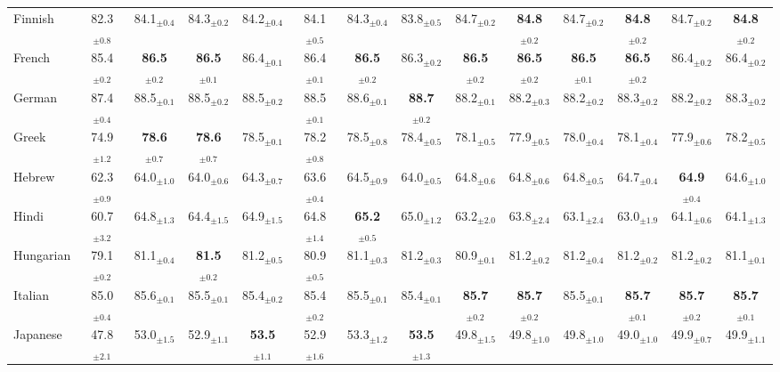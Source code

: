\begin{table*}[ht]
{\begin{tabular}{lccccccccccccc}
Finnish & 82.3$_{\pm 0.8}$ & 84.1$_{\pm 0.4}$ & 84.3$_{\pm 0.2}$ & 84.2$_{\pm 0.4}$ & 84.1$_{\pm 0.5}$ & 84.3$_{\pm 0.4}$ & 83.8$_{\pm 0.5}$ & 84.7$_{\pm 0.2}$ & \textbf{84.8}$_{\pm 0.2}$ & 84.7$_{\pm 0.2}$ & \textbf{84.8}$_{\pm 0.2}$ & 84.7$_{\pm 0.2}$ & \textbf{84.8}$_{\pm 0.2}$ \\
French & 85.4$_{\pm 0.2}$ & \textbf{86.5}$_{\pm 0.2}$ & \textbf{86.5}$_{\pm 0.1}$ & 86.4$_{\pm 0.1}$ & 86.4$_{\pm 0.1}$ & \textbf{86.5}$_{\pm 0.2}$ & 86.3$_{\pm 0.2}$ & \textbf{86.5}$_{\pm 0.2}$ & \textbf{86.5}$_{\pm 0.2}$ & \textbf{86.5}$_{\pm 0.1}$ & \textbf{86.5}$_{\pm 0.2}$ & 86.4$_{\pm 0.2}$ & 86.4$_{\pm 0.2}$ \\
German & 87.4$_{\pm 0.4}$ & 88.5$_{\pm 0.1}$ & 88.5$_{\pm 0.2}$ & 88.5$_{\pm 0.2}$ & 88.5$_{\pm 0.1}$ & 88.6$_{\pm 0.1}$ & \textbf{88.7}$_{\pm 0.2}$ & 88.2$_{\pm 0.1}$ & 88.2$_{\pm 0.3}$ & 88.2$_{\pm 0.2}$ & 88.3$_{\pm 0.2}$ & 88.2$_{\pm 0.2}$ & 88.3$_{\pm 0.2}$ \\
Greek & 74.9$_{\pm 1.2}$ & \textbf{78.6}$_{\pm 0.7}$ & \textbf{78.6}$_{\pm 0.7}$ & 78.5$_{\pm 0.1}$ & 78.2$_{\pm 0.8}$ & 78.5$_{\pm 0.8}$ & 78.4$_{\pm 0.5}$ & 78.1$_{\pm 0.5}$ & 77.9$_{\pm 0.5}$ & 78.0$_{\pm 0.4}$ & 78.1$_{\pm 0.4}$ & 77.9$_{\pm 0.6}$ & 78.2$_{\pm 0.5}$ \\
Hebrew & 62.3$_{\pm 0.9}$ & 64.0$_{\pm 1.0}$ & 64.0$_{\pm 0.6}$ & 64.3$_{\pm 0.7}$ & 63.6$_{\pm 0.4}$ & 64.5$_{\pm 0.9}$ & 64.0$_{\pm 0.5}$ & 64.8$_{\pm 0.6}$ & 64.8$_{\pm 0.6}$ & 64.8$_{\pm 0.5}$ & 64.7$_{\pm 0.4}$ & \textbf{64.9}$_{\pm 0.4}$ & 64.6$_{\pm 1.0}$ \\
Hindi & 60.7$_{\pm 3.2}$ & 64.8$_{\pm 1.3}$ & 64.4$_{\pm 1.5}$ & 64.9$_{\pm 1.5}$ & 64.8$_{\pm 1.4}$ & \textbf{65.2}$_{\pm 0.5}$ & 65.0$_{\pm 1.2}$ & 63.2$_{\pm 2.0}$ & 63.8$_{\pm 2.4}$ & 63.1$_{\pm 2.4}$ & 63.0$_{\pm 1.9}$ & 64.1$_{\pm 0.6}$ & 64.1$_{\pm 1.3}$ \\
Hungarian & 79.1$_{\pm 0.2}$ & 81.1$_{\pm 0.4}$ & \textbf{81.5}$_{\pm 0.2}$ & 81.2$_{\pm 0.5}$ & 80.9$_{\pm 0.5}$ & 81.1$_{\pm 0.3}$ & 81.2$_{\pm 0.3}$ & 80.9$_{\pm 0.1}$ & 81.2$_{\pm 0.2}$ & 81.2$_{\pm 0.4}$ & 81.2$_{\pm 0.2}$ & 81.2$_{\pm 0.2}$ & 81.1$_{\pm 0.1}$ \\
Italian & 85.0$_{\pm 0.4}$ & 85.6$_{\pm 0.1}$ & 85.5$_{\pm 0.1}$ & 85.4$_{\pm 0.2}$ & 85.4$_{\pm 0.2}$ & 85.5$_{\pm 0.1}$ & 85.4$_{\pm 0.1}$ & \textbf{85.7}$_{\pm 0.2}$ & \textbf{85.7}$_{\pm 0.2}$ & 85.5$_{\pm 0.1}$ & \textbf{85.7}$_{\pm 0.1}$ & \textbf{85.7}$_{\pm 0.2}$ & \textbf{85.7}$_{\pm 0.1}$ \\
Japanese & 47.8$_{\pm 2.1}$ & 53.0$_{\pm 1.5}$ & 52.9$_{\pm 1.1}$ & \textbf{53.5}$_{\pm 1.1}$ & 52.9$_{\pm 1.6}$ & 53.3$_{\pm 1.2}$ & \textbf{53.5}$_{\pm 1.3}$ & 49.8$_{\pm 1.5}$ & 49.8$_{\pm 1.0}$ & 49.8$_{\pm 1.0}$ & 49.0$_{\pm 1.0}$ & 49.9$_{\pm 0.7}$ & 49.9$_{\pm 1.1}$ \\

\end{tabular}}
\end{table*}
